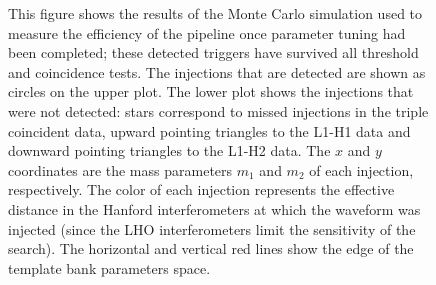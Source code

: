 \begin{figure}[p]
{\label{f:m1m2_found_missed}%
This figure shows the results of the Monte Carlo simulation used to measure
the efficiency of the pipeline once parameter tuning had been completed; these
detected triggers have survived all threshold and coincidence tests.  The
injections that are detected are shown as circles on the upper plot.  The
lower plot shows the injections that were not detected: stars correspond to
missed injections in the triple coincident data, upward pointing triangles to
the L1-H1 data and downward pointing triangles to the L1-H2 data. The $x$ and
$y$ coordinates are the mass parameters $m_1$ and $m_2$ of each injection,
respectively. The color of each injection represents the effective distance in
the Hanford interferometers at which the waveform was injected (since the LHO
interferometers limit the sensitivity of the search).  The horizontal and
vertical red lines show the edge of the template bank parameters space. 
}
\end{figure}

